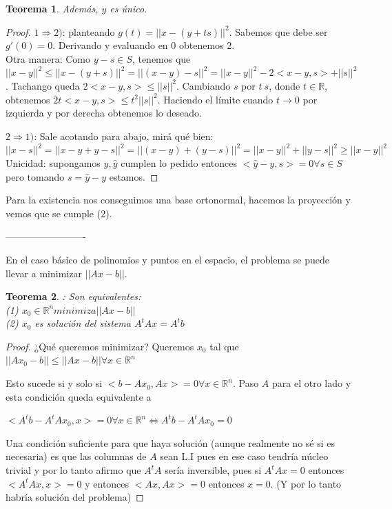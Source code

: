 \documentclass[10pt,a4paper,final]{report}
\newtheorem{theorem}{Teorema}
\def\R{\mathbb{R}}
\begin{document}
{\begin{theorem}
Además, $y$ es único.
\end{theorem}

\begin{proof}$1 \Rightarrow 2)$: planteando $g(t)=||x-(y+ts)||^2$. Sabemos que debe ser $g'(0)=0$. Derivando y evaluando en $0$ obtenemos 2.\\

Otra manera: Como $y-s \in S$, tenemos que $||x-y||^2 \leq ||x-(y+s)||^2 = ||(x-y) - s||^2 = ||x-y||^2 -2<x-y,s> + ||s||^2$. Tachango queda $2<x-y,s> \leq ||s||^2$. Cambiando $s$ por $t\ s$, donde $t\in\R$, obtenemos $2t<x-y,s> \leq t^2 ||s||^2$. Haciendo el límite cuando $t \to 0$ por izquierda y por derecha obtenemos lo deseado.

$2 \Rightarrow 1)$: Sale acotando para abajo, mirá qué bien: $||x-s||^2 = ||x-y+y-s||^2 = ||(x-y)+(y-s)||^2 = ||x-y||^2 + ||y-s||^2 \geq ||x-y||^2$\\

Unicidad: supongamos $y,\hat{y}$ cumplen lo pedido entonces $<\hat{y}-y,s>=0 \forall s\in S$ pero tomando $s = \hat{y}-y$ estamos.
\end{proof}

Para la existencia nos conseguimos una base ortonormal, hacemos la proyección y vemos que se cumple (2).


-------------------------

En el caso básico de polinomios y puntos en el espacio, el problema se puede llevar a minimizar $||Ax-b||$.\\

\begin{theorem}: Son equivalentes:
\\
(1) $x_0 \in \mathbb{R}^n minimiza ||Ax-b||$\\
(2) $x_0$ es solución del sistema $A^tA x = A^t b$
\end{theorem}


\begin{proof}
¿Qué queremos minimizar? Queremos $x_0$ tal que $||A x_0 - b || \leq ||A x - b|| \forall x \in \mathbb{R}^n$

Esto sucede si y solo si $<b - A x_0, A x > = 0 \forall x \in \mathbb{R}^n$. Paso $A$ para el otro lado y esta condición queda equivalente a

$<A^tb - A^t A x_0, x> = 0 \forall x \in \mathbb{R}^n \Leftrightarrow A^tb - A^t A x_0 = 0$

Una condición suficiente para que haya solución (aunque realmente no sé si es necesaria) es que las columnas de $A$ sean L.I pues en ese caso tendría núcleo trivial y por lo tanto afirmo que $A^t A$ sería inversible, pues si $A^tAx=0$ entonces $<A^tAx,x> = 0$ y entonces $<Ax,Ax>=0$ entonces $x=0$. (Y por lo tanto habría solución del problema)


\end{proof}}
\end{document}
